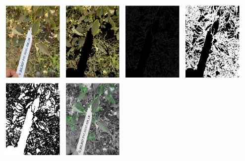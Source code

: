 \documentclass[final,5p,times,twocolumn,authoryear]{elsarticle}
\begin{document}
\begin{center}
	\centering
	\includegraphics[width=0.23\textwidth]{images/seg_pipeline/1.png}	
        \includegraphics[width=0.23\textwidth]{images/seg_pipeline/2.png}      	\includegraphics[width=0.23\textwidth]{images/seg_pipeline/3.png}	
	\includegraphics[width=0.23\textwidth]{images/seg_pipeline/4.png}	
	\includegraphics[width=0.23\textwidth]{images/seg_pipeline/5.png}	
	\includegraphics[width=0.23\textwidth]{images/seg_pipeline/6.png}	
\end{center}
\end{document}
